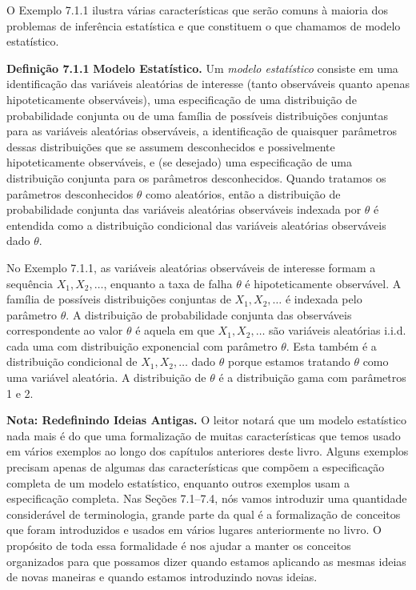 \vspace{1cm}
O Exemplo 7.1.1 ilustra várias características que serão comuns à maioria dos problemas de inferência estatística e que constituem o que chamamos de modelo estatístico.
\vspace{1cm}

\noindent\textbf{Definição 7.1.1} \quad \textbf{Modelo Estatístico.} Um \textit{modelo estatístico} consiste em uma identificação das variáveis aleatórias de interesse (tanto observáveis quanto apenas hipoteticamente observáveis), uma especificação de uma distribuição de probabilidade conjunta ou de uma família de possíveis distribuições conjuntas para as variáveis aleatórias observáveis, a identificação de quaisquer parâmetros dessas distribuições que se assumem desconhecidos e possivelmente hipoteticamente observáveis, e (se desejado) uma especificação de uma distribuição conjunta para os parâmetros desconhecidos. Quando tratamos os parâmetros desconhecidos $\theta$ como aleatórios, então a distribuição de probabilidade conjunta das variáveis aleatórias observáveis indexada por $\theta$ é entendida como a distribuição condicional das variáveis aleatórias observáveis dado $\theta$.

\vspace{1cm}
No Exemplo 7.1.1, as variáveis aleatórias observáveis de interesse formam a sequência $X_1, X_2, \dots$, enquanto a taxa de falha $\theta$ é hipoteticamente observável. A família de possíveis distribuições conjuntas de $X_1, X_2, \dots$ é indexada pelo parâmetro $\theta$. A distribuição de probabilidade conjunta das observáveis correspondente ao valor $\theta$ é aquela em que $X_1, X_2, \dots$ são variáveis aleatórias i.i.d. cada uma com distribuição exponencial com parâmetro $\theta$. Esta também é a distribuição condicional de $X_1, X_2, \dots$ dado $\theta$ porque estamos tratando $\theta$ como uma variável aleatória. A distribuição de $\theta$ é a distribuição gama com parâmetros 1 e 2.

\vspace{1cm}
\noindent\textbf{Nota: Redefinindo Ideias Antigas.} O leitor notará que um modelo estatístico nada mais é do que uma formalização de muitas características que temos usado em vários exemplos ao longo dos capítulos anteriores deste livro. Alguns exemplos precisam apenas de algumas das características que compõem a especificação completa de um modelo estatístico, enquanto outros exemplos usam a especificação completa. Nas Seções 7.1–7.4, nós vamos introduzir uma quantidade considerável de terminologia, grande parte da qual é a formalização de conceitos que foram introduzidos e usados em vários lugares anteriormente no livro. O propósito de toda essa formalidade é nos ajudar a manter os conceitos organizados para que possamos dizer quando estamos aplicando as mesmas ideias de novas maneiras e quando estamos introduzindo novas ideias.

